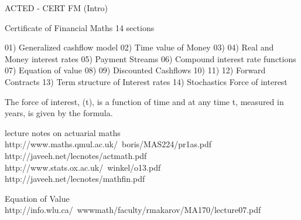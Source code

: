 ACTED - CERT FM (Intro)





Certificate of Financial Maths
14 sections


01) Generalized cashflow model
02) Time value of Money
03)
04) Real and Money interest rates
05) Payment Streams
06) Compound interest rate functions
07) Equation of value
08)
09) Discounted Cashflows
10)
11)
12) Forward Contracts
13) Term structure of Interest rates
14) Stochastics
Force of interest


The force of interest, (t), is a function of time and at any time t, measured in years, is given by the formula.








lecture notes on actuarial maths
http://www.maths.qmul.ac.uk/~boris/MAS224/pr1as.pdf
http://javeeh.net/lecnotes/actmath.pdf
http://www.stats.ox.ac.uk/~winkel/o13.pdf
http://javeeh.net/lecnotes/mathfin.pdf


Equation of Value
http://info.wlu.ca/~wwwmath/faculty/rmakarov/MA170/lecture07.pdf
